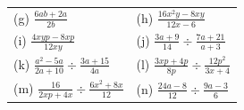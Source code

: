 \begin{enumerate}[noitemsep, label=\textbf{\arabic*}. ]
{\begin{tabular}[t]{|l|l|}
        (g) $\frac{6ab+2a}{2b}$\hspace{1ex} &
        (h) $\frac{16{x}^{2}y-8xy}{12x-6}$\hspace{1ex}%
     \tabularnewline\cline{1-1}\cline{2-2}
        (i) $\frac{4xyp-8xp}{12xy}$\hspace{1ex} &
        (j) $\frac{3a+9}{14}÷\frac{7a+21}{a+3}$\hspace{1ex}%
     \tabularnewline\cline{1-1}\cline{2-2}
        (k) $\frac{{a}^{2}-5a}{2a+10}÷\frac{3a+15}{4a}$\hspace{1ex} &
        (l) $\frac{3xp+4p}{8p}÷\frac{12{p}^{2}}{3x+4}$\hspace{1ex}%
     \tabularnewline\cline{1-1}\cline{2-2}
        (m) $\frac{16}{2xp+4x}÷\frac{6{x}^{2}+8x}{12}$\hspace{1ex} &
        (n) $\frac{24a-8}{12}÷\frac{9a-3}{6}$\hspace{1ex}%

\end{tabular}}
\end{enumerate}
